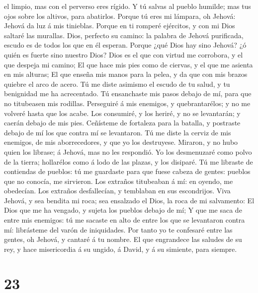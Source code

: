 el limpio, mas con el perverso eres rígido.  Y tú salvas al
pueblo humilde; mas tus ojos sobre los altivos, para abatirlos.
 Porque tú eres mi lámpara, oh Jehová: Jehová da luz á mis
tinieblas.  Porque en ti romperé ejércitos, y con mi Dios
saltaré las murallas.  Dios, perfecto su camino: la palabra
de Jehová purificada, escudo es de todos los que en él esperan.
 Porque ¿qué Dios hay sino Jehová? ¿ó quién es fuerte sino
nuestro Dios?  Dios es el que con virtud me corrobora, y el
que despeja mi camino;  El que hace mis pies como de
ciervas, y el que me asienta en mis alturas;  El que enseña
mis manos para la pelea, y da que con mis brazos quiebre el arco de
acero.  Tú me diste asimismo el escudo de tu salud, y tu
benignidad me ha acrecentado.  Tú ensanchaste mis pasos
debajo de mí, para que no titubeasen mis rodillas. 
Perseguiré á mis enemigos, y quebrantarélos; y no me volveré hasta que
los acabe.  Los consumiré, y los heriré, y no se
levantarán; y caerán debajo de mis pies.  Ceñísteme de
fortaleza para la batalla, y postraste debajo de mí los que contra mí se
levantaron.  Tú me diste la cerviz de mis enemigos, de mis
aborrecedores, y que yo los destruyese.  Miraron, y no hubo
quien los librase; á Jehová, mas no les respondió.  Yo los
desmenuzaré como polvo de la tierra; hollarélos como á lodo de las
plazas, y los disiparé.  Tú me libraste de contiendas de
pueblos: tú me guardaste para que fuese cabeza de gentes: pueblos que no
conocía, me sirvieron.  Los extraños titubeaban á mí: en
oyendo, me obedecían.  Los extraños desfallecían, y
temblaban en sus escondrijos.  Viva Jehová, y sea bendita
mi roca; sea ensalzado el Dios, la roca de mi salvamento: 
El Dios que me ha vengado, y sujeta los pueblos debajo de mí;
 Y que me saca de entre mis enemigos: tú me sacaste en alto
de entre los que se levantaron contra mí: librásteme del varón de
iniquidades.  Por tanto yo te confesaré entre las gentes,
oh Jehová, y cantaré á tu nombre.  El que engrandece las
saludes de su rey, y hace misericordia á su ungido, á David, y á su
simiente, para siempre.

\hypertarget{section-22}{%
\section{23}\label{section-22}}

